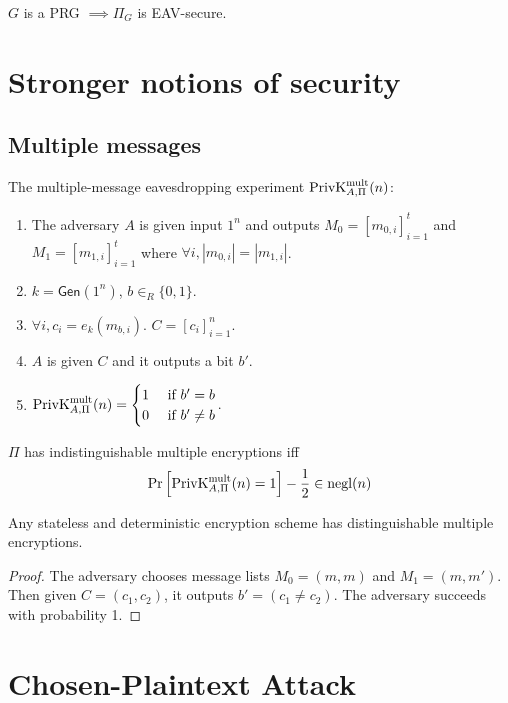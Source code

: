 \begin{theorem} $G$ is a PRG $\implies \Pi_G$ is EAV-secure. \end{theorem}

\section{Stronger notions of security}

\subsection{Multiple messages}

The multiple-message eavesdropping experiment $\PrivKExpt{mult}{A,\Pi}(n)$:
\begin{enumerate}
\item The adversary $A$ is given input $1^n$ and outputs
$M_0 = [m_{0,i}]_{i=1}^t$ and $M_1 = [m_{1,i}]_{i=1}^t$ where $\forall i, |m_{0,i}| = |m_{1,i}|$.
\item $k = \mathsf{Gen}(1^n)$, $b \in_R \{0, 1\}$.
\item $\forall i, c_i = e_k(m_{b,i})$. $C = [c_i]_{i=1}^n$.
\item $A$ is given $C$ and it outputs a bit $b'$.
\item $\PrivKExpt{mult}{A,\Pi}(n) = \begin{cases}1 & \textrm{ if } b' = b \\ 0 & \textrm{ if } b' \neq b\end{cases}$.
\end{enumerate}

\begin{definition}
$\Pi$ has indistinguishable multiple encryptions iff
\[ \Pr\left[\PrivKExpt{mult}{A,\Pi}(n) = 1\right] - \frac{1}{2} \in \operatorname{negl}(n) \]
\end{definition}

\begin{theorem}
Any stateless and deterministic encryption scheme has distinguishable multiple encryptions.
\end{theorem}
\begin{proof}
The adversary chooses message lists $M_0 = (m, m)$ and $M_1 = (m, m')$.
Then given $C = (c_1, c_2)$, it outputs $b' = (c_1 \neq c_2)$.
The adversary succeeds with probability 1.
\end{proof}

\section{Chosen-Plaintext Attack}

